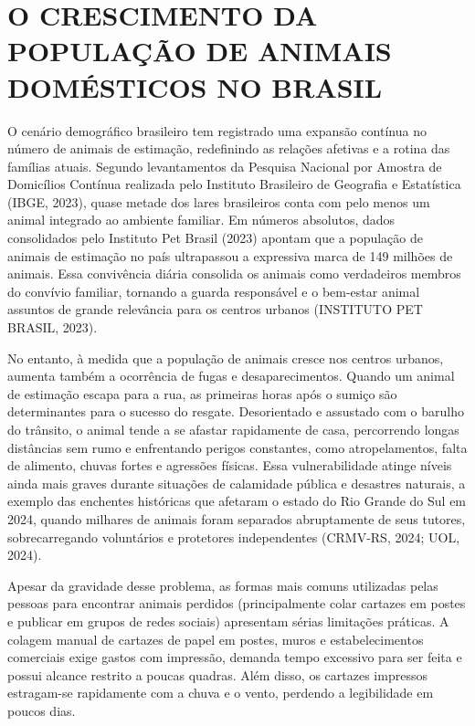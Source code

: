 \section{O CRESCIMENTO DA POPULAÇÃO DE ANIMAIS DOMÉSTICOS NO BRASIL}

O cenário demográfico brasileiro tem registrado uma expansão contínua no número de animais de estimação, redefinindo as relações afetivas e a rotina das famílias atuais. Segundo levantamentos da Pesquisa Nacional por Amostra de Domicílios Contínua realizada pelo Instituto Brasileiro de Geografia e Estatística (IBGE, 2023), quase metade dos lares brasileiros conta com pelo menos um animal integrado ao ambiente familiar. Em números absolutos, dados consolidados pelo Instituto Pet Brasil (2023) apontam que a população de animais de estimação no país ultrapassou a expressiva marca de 149 milhões de animais. Essa convivência diária consolida os animais como verdadeiros membros do convívio familiar, tornando a guarda responsável e o bem-estar animal assuntos de grande relevância para os centros urbanos (INSTITUTO PET BRASIL, 2023).

No entanto, à medida que a população de animais cresce nos centros urbanos, aumenta também a ocorrência de fugas e desaparecimentos. Quando um animal de estimação escapa para a rua, as primeiras horas após o sumiço são determinantes para o sucesso do resgate. Desorientado e assustado com o barulho do trânsito, o animal tende a se afastar rapidamente de casa, percorrendo longas distâncias sem rumo e enfrentando perigos constantes, como atropelamentos, falta de alimento, chuvas fortes e agressões físicas. Essa vulnerabilidade atinge níveis ainda mais graves durante situações de calamidade pública e desastres naturais, a exemplo das enchentes históricas que afetaram o estado do Rio Grande do Sul em 2024, quando milhares de animais foram separados abruptamente de seus tutores, sobrecarregando voluntários e protetores independentes (CRMV-RS, 2024; UOL, 2024).

Apesar da gravidade desse problema, as formas mais comuns utilizadas pelas pessoas para encontrar animais perdidos (principalmente colar cartazes em postes e publicar em grupos de redes sociais) apresentam sérias limitações práticas. A colagem manual de cartazes de papel em postes, muros e estabelecimentos comerciais exige gastos com impressão, demanda tempo excessivo para ser feita e possui alcance restrito a poucas quadras. Além disso, os cartazes impressos estragam-se rapidamente com a chuva e o vento, perdendo a legibilidade em poucos dias.

